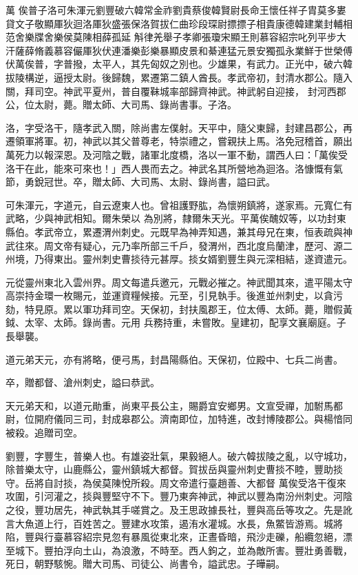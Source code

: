 
\begin{pinyinscope}

 萬
 俟普子洛可朱渾元劉豐破六韓常金祚劉貴蔡俊韓賢尉長命王懷任祥子胄莫多婁貸文子敬顯厙狄迴洛厙狄盛張保洛賀拔仁曲珍段琛尉摽摽子相貴康德韓建業封輔相范舍樂牒舍樂侯莫陳相薛孤延
 斛律羌舉子孝卿張瓊宋顯王則慕容紹宗叱列平步大汗薩薛脩義慕容儼厙狄伏連潘樂彭樂暴顯皮景和綦連猛元景安獨孤永業鮮于世榮傅伏萬俟普，字普撥，太平人，其先匈奴之別也。少雄果，有武力。正光中，破六韓拔陵構逆，逼授太尉。後歸魏，累遷第二鎮人酋長。孝武帝初，封清水郡公。隨入關，拜司空。神武平夏州，普自覆靺城率部歸齊神武。神武躬自迎接，
 封河西郡公，位太尉，薨。贈太師、大司馬、錄尚書事。子洛。



 洛，字受洛干，隨孝武入關，除尚書左僕射。天平中，隨父東歸，封建昌郡公，再遷領軍將軍。初，神武以其父普尊老，特崇禮之，嘗親扶上馬。洛免冠稽首，願出萬死力以報深恩。及河陰之戰，諸軍北度橋，洛以一軍不動，謂西人曰：「萬俟受洛干在此，能來可來也！」西人畏而去之。神武名其所營地為迴洛。洛慷慨有氣節，勇銳冠世。卒，贈太師、大司馬、太尉、錄尚書，謚曰武。



 可朱渾元，字道元，自云遼東人也。曾祖護野肱，為懷朔鎮將，遂家焉。元寬仁有武略，少與神武相知。爾朱榮以
 為別將，隸爾朱天光。平萬俟醜奴等，以功封東縣伯。孝武帝立，累遷渭州刺史。元既早為神弄知遇，兼其母兄在東，恒表疏與神武往來。周文帝有疑心，元乃率所部三千戶，發渭州，西北度烏蘭津，歷河、源二州境，乃得東出。靈州刺史曹掞待元甚厚。掞女婿劉豐生與元深相結，遂資遣元。



 元從靈州東北入雲州界。周文每遣兵邀元，元戰必摧之。神武聞其來，遣平陽太守高崇持金環一枚賜元，並運資糧候接。元至，引見執手。後進並州刺史，以貪污劾，特見原。累以軍功拜司空。天保初，封扶風郡王，位太傅、太師。薨，贈假黃鉞、太宰、太師。錄尚書。元用
 兵務持重，未嘗敗。皇建初，配享文襄廟庭。子長舉襲。



 道元弟天元，亦有將略，便弓馬，封昌陽縣伯。天保初，位殿中、七兵二尚書。



 卒，贈都督、滄州刺史，謚曰恭武。



 天元弟天和，以道元勛重，尚東平長公主，賜爵宜安鄉男。文宣受禪，加駙馬都尉，位開府儀同三司，封成皋郡公。濟南即位，加特進，改封博陵郡公。與楊愔同被殺。追贈司空。



 劉豐，字豐生，普樂人也。有雄姿壯氣，果毅絕人。破六韓拔陵之亂，以守城功，除普樂太守，山鹿縣公，靈州鎮城大都督。賀拔岳與靈州刺史曹掞不睦，豐助掞守。岳將自討掞，為侯莫陳悅所殺。周文帝遣行臺趙善、大都督
 萬俟受洛干復來攻圍，引河灌之，掞與豐堅守不下。豐乃東奔神武，神武以豐為南汾州刺史。河陰之役，豐功居先，神武執其手嗟賞之。及王思政據長社，豐與高岳等攻之。先是訛言大魚道上行，百姓苦之。豐建水攻策，遏洧水灌城。水長，魚鱉皆游焉。城將陷，豐與行臺慕容紹宗見忽有暴風從東北來，正晝昏暗，飛沙走礫，船纜忽絕，漂至城下。豐拍浮向土山，為浪激，不時至。西人鉤之，並為敵所害。豐壯勇善戰，死日，朝野駭惋。贈大司馬、司徒公、尚書令，謚武忠。子曄嗣。




\end{pinyinscope}
